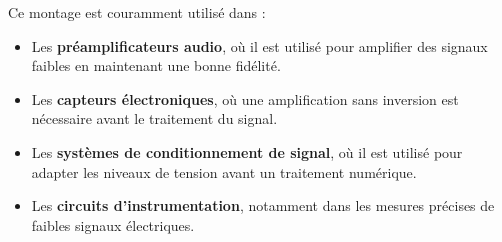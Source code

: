 Ce montage est couramment utilisé dans :
\begin{itemize}
    \item Les \textbf{préamplificateurs audio}, où il est utilisé pour amplifier des signaux faibles en maintenant une bonne fidélité.
    \item Les \textbf{capteurs électroniques}, où une amplification sans inversion est nécessaire avant le traitement du signal.
    \item Les \textbf{systèmes de conditionnement de signal}, où il est utilisé pour adapter les niveaux de tension avant un traitement numérique.
    \item Les \textbf{circuits d'instrumentation}, notamment dans les mesures précises de faibles signaux électriques.
\end{itemize}
